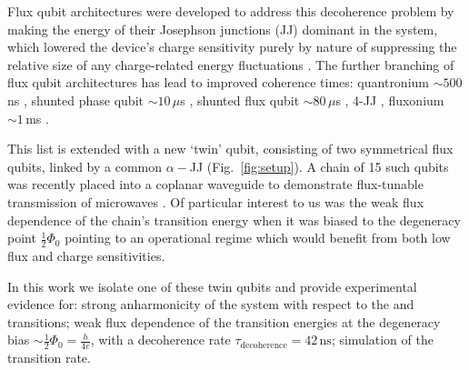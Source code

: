 Flux qubit architectures were developed to address this decoherence problem by making the energy of their Josephson junctions (JJ) dominant in the system, which lowered the device's charge sensitivity purely by nature of suppressing the relative size of any charge-related energy fluctuations  \cite{orlando1999}\cite{chiorescu2003}\cite{mooij1999}. The further branching of flux qubit architectures has lead to improved coherence times: quantronium $\sim500\,$ns \cite{cottet2002} \cite{gu2017}, shunted phase qubit $\sim10\,\mu $s \cite{stern2014} , shunted flux qubit $\sim80\,\mu$s \cite{yan2016} , 4-JJ \cite{qui2016}, fluxonium $\sim1\,$ms \cite{pop2014}.
 
This list is extended with a new `twin' qubit, consisting of two symmetrical flux qubits, linked by a common $ \alpha-$JJ (Fig.~\ref{fig:setup}). A chain of 15 such qubits was recently placed into a coplanar
waveguide to demonstrate flux-tunable transmission of microwaves \cite{shulga2018}. Of particular interest to us was the weak flux dependence of the chain's transition energy when it was biased to the degeneracy point $\frac{1}{2}\Phi_0 $ pointing to an operational regime which would benefit from both low flux and charge sensitivities.
 
In this work we isolate one of these twin qubits and provide experimental evidence for: strong anharmonicity of the system with respect to the \ilra{} and
\ilra{} transitions; weak flux dependence of the transition energies at the
degeneracy bias $\sim \frac{1}{2}\Phi_0 = \frac{h}{4e}$, with a decoherence rate
$ \tau_\text{decoherence} = 42\, \text{ns} $; simulation of the ~\ilra~ transition rate.

